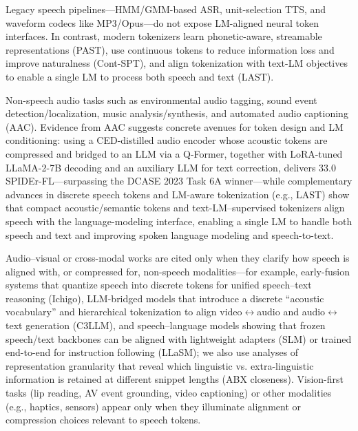 \documentclass{article}
\begin{document}
  \item Legacy speech pipelines---HMM/GMM-based ASR, unit-selection TTS, and waveform codecs like MP3/Opus---do not expose LM-aligned neural token interfaces. In contrast, modern tokenizers learn phonetic-aware, streamable representations (PAST), use continuous tokens to reduce information loss and improve naturalness (Cont-SPT), and align tokenization with text-LM objectives to enable a single LM to process both speech and text (LAST). \cite{li2025continuousspeechtokenizertext,har-tuv2025pastphoneticacousticspeechtokenizer,turetzky2024lastlanguagemodelawarespeechtokenization}

  \item Non-speech audio tasks such as environmental audio tagging, sound event detection/localization, music analysis/synthesis, and automated audio captioning (AAC). Evidence from AAC suggests concrete avenues for token design and LM conditioning: using a CED-distilled audio encoder whose acoustic tokens are compressed and bridged to an LLM via a Q-Former, together with LoRA-tuned LLaMA-2-7B decoding and an auxiliary LLM for text correction, delivers 33.0 SPIDEr-FL---surpassing the DCASE 2023 Task 6A winner---while complementary advances in discrete speech tokens and LM-aware tokenization (e.g., LAST) show that compact acoustic/semantic tokens and text-LM--supervised tokenizers align speech with the language-modeling interface, enabling a single LM to handle both speech and text and improving spoken language modeling and speech-to-text. \cite{guo2025recentadvancesdiscretespeechtokensreview,liu2024enhancingautomatedaudiocaptioninglargela,turetzky2024lastlanguagemodelawarespeechtokenization}

  \item Audio--visual or cross-modal works are cited only when they clarify how speech is aligned with, or compressed for, non-speech modalities---for example, early-fusion systems that quantize speech into discrete tokens for unified speech--text reasoning (Ichigo), LLM-bridged models that introduce a discrete ``acoustic vocabulary'' and hierarchical tokenization to align video$\leftrightarrow$audio and audio$\leftrightarrow$text generation (C3LLM), and speech--language models showing that frozen speech/text backbones can be aligned with lightweight adapters (SLM) or trained end-to-end for instruction following (LLaSM); we also use analyses of representation granularity that reveal which linguistic vs. extra-linguistic information is retained at different snippet lengths (ABX closeness). Vision-first tasks (lip reading, AV event grounding, video captioning) or other modalities (e.g., haptics, sensors) appear only when they illuminate alignment or compression choices relevant to speech tokens. \cite{dao2025ichigomixedmodalearlyfusionrealtimevoice,fily2024establishingdegreesclosenessbetweenaudio,shu2023llasmlargelanguagespeechmodel,wang2023slmbridgethingapbetweenspeechtextfoundat,wang2024c3llmconditionalmultimodalcontentgenerat}
\end{document}
